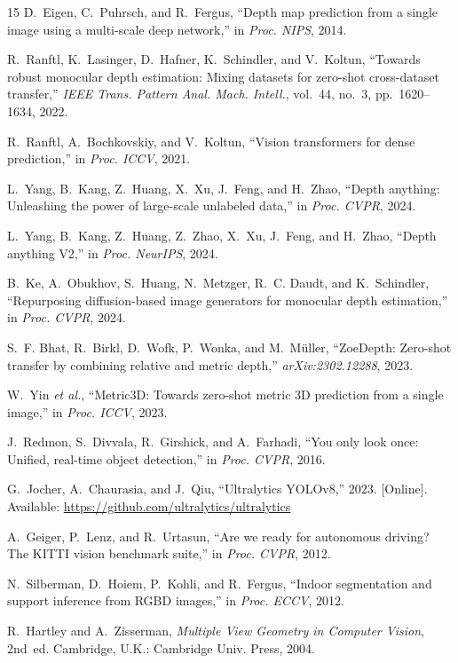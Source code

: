 \documentclass[conference]{IEEEtran}
\begin{document}
\begin{thebibliography}{15}
D.~Eigen, C.~Puhrsch, and R.~Fergus, ``Depth map prediction from a single image
using a multi-scale deep network,'' in \emph{Proc. NIPS}, 2014.

R.~Ranftl, K.~Lasinger, D.~Hafner, K.~Schindler, and V.~Koltun, ``Towards robust
monocular depth estimation: Mixing datasets for zero-shot cross-dataset
transfer,'' \emph{IEEE Trans. Pattern Anal. Mach. Intell.}, vol.~44, no.~3,
pp.~1620--1634, 2022.

R.~Ranftl, A.~Bochkovskiy, and V.~Koltun, ``Vision transformers for dense
prediction,'' in \emph{Proc. ICCV}, 2021.

L.~Yang, B.~Kang, Z.~Huang, X.~Xu, J.~Feng, and H.~Zhao, ``Depth anything:
Unleashing the power of large-scale unlabeled data,'' in \emph{Proc. CVPR}, 2024.

L.~Yang, B.~Kang, Z.~Huang, Z.~Zhao, X.~Xu, J.~Feng, and H.~Zhao, ``Depth
anything V2,'' in \emph{Proc. NeurIPS}, 2024.

B.~Ke, A.~Obukhov, S.~Huang, N.~Metzger, R.~C. Daudt, and K.~Schindler,
``Repurposing diffusion-based image generators for monocular depth estimation,''
in \emph{Proc. CVPR}, 2024.

S.~F. Bhat, R.~Birkl, D.~Wofk, P.~Wonka, and M.~M{\"u}ller, ``ZoeDepth:
Zero-shot transfer by combining relative and metric depth,''
\emph{arXiv:2302.12288}, 2023.

W.~Yin \emph{et al.}, ``Metric3D: Towards zero-shot metric 3D prediction from a
single image,'' in \emph{Proc. ICCV}, 2023.

J.~Redmon, S.~Divvala, R.~Girshick, and A.~Farhadi, ``You only look once:
Unified, real-time object detection,'' in \emph{Proc. CVPR}, 2016.

G.~Jocher, A.~Chaurasia, and J.~Qiu, ``Ultralytics YOLOv8,'' 2023. [Online].
Available: \url{https://github.com/ultralytics/ultralytics}

A.~Geiger, P.~Lenz, and R.~Urtasun, ``Are we ready for autonomous driving? The
KITTI vision benchmark suite,'' in \emph{Proc. CVPR}, 2012.

N.~Silberman, D.~Hoiem, P.~Kohli, and R.~Fergus, ``Indoor segmentation and
support inference from RGBD images,'' in \emph{Proc. ECCV}, 2012.

R.~Hartley and A.~Zisserman, \emph{Multiple View Geometry in Computer Vision},
2nd~ed. Cambridge, U.K.: Cambridge Univ. Press, 2004.

\end{thebibliography}
\end{document}

